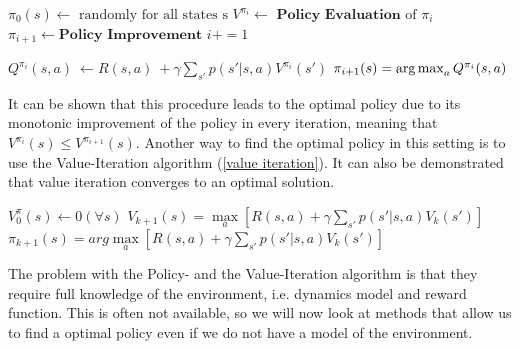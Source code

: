 \hspace{-0.7cm}
\begin{minipage}[t]{0.45\textwidth}
\begin{algorithm}[H]
   \large
    \caption{Policy Iteration}\label{policy iteration}
    \begin{algorithmic}
        \STATE  $\pi_0(s) \gets \text{ randomly for all states s} $
                \STATE $V^{\pi_i} \gets \textbf{ Policy Evaluation} \text{ of } \pi_i$
                \STATE $\pi_{i+1} \gets \textbf{Policy Improvement}$
                \STATE $i+=1$
            \ENDWHILE
    \end{algorithmic}
\end{algorithm}
\end{minipage}
\begin{minipage}[t]{0.55\textwidth}
\begin{algorithm}[H]
  \large
    \caption{Policy Improvement}\label{policy improvement}
    \begin{algorithmic}
        \STATE $Q^{\pi_i}(s,a) \ \gets R(s,a) \ + \gamma \sum_{s'}p(s'|s,a) V^{\pi_i}(s')$
        \ENDFOR
        \STATE $\pi_{i+1}(s) = \operatorname*{arg\,max}_{a} Q^{\pi_i}(s,a)$
        \ENDFOR
    \end{algorithmic}
\end{algorithm}
\vspace{0.3cm}
\end{minipage}
It can be shown that this procedure leads to the optimal policy due to its monotonic 
improvement of the policy in every iteration, meaning that $V^{\pi_i}(s) \leq V^{\pi_{i+1}}(s)$.\newline
Another way to find the optimal policy in this setting  is to use the Value-Iteration algorithm 
(\ref{value iteration}). It can also be demonstrated that value iteration converges to an optimal solution. 
\begin{algorithm}[H]
  \large
    \caption{Value Iteration}\label{value iteration}
    \begin{algorithmic}
        \STATE $V_0^{\pi}(s)\gets 0 (\forall s)$
        \STATE $V_{k+1}(s)=\max\limits_{a}\left[R(s,a)+\gamma \sum_{s'}p(s'|s,a)V_k(s')\right]$
        \STATE $\pi_{k+1}(s)=arg \max\limits_{a}\left[R(s,a)+\gamma \sum_{s'}p(s'|s,a)V_k(s')\right]$
            \ENDFOR
        \ENDWHILE
    \end{algorithmic}
\end{algorithm}
The problem with the Policy- and the Value-Iteration algorithm is that they require 
full knowledge of the environment, i.e. dynamics model and reward function. This is often 
not available, so we will now look at methods that allow us to find a optimal policy even 
if we do not have a model of the environment.
